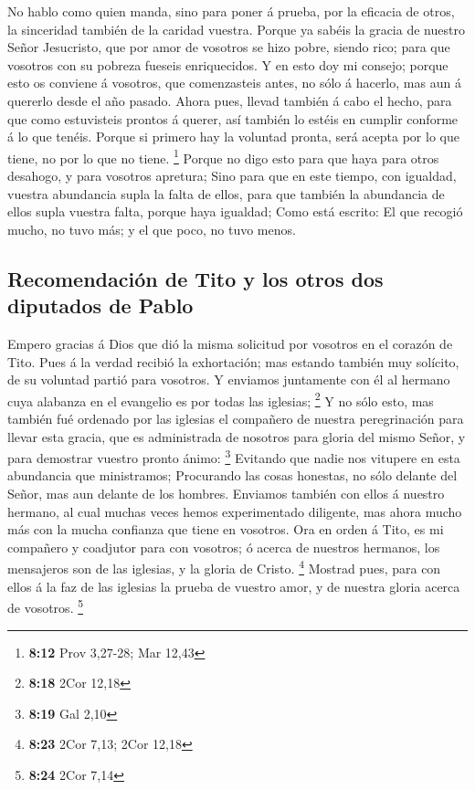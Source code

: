  No hablo como quien manda, sino para poner á prueba, por
la eficacia de otros, la sinceridad también de la caridad vuestra.
 Porque ya sabéis la gracia de nuestro Señor Jesucristo,
que por amor de vosotros se hizo pobre, siendo rico; para que vosotros
con su pobreza fueseis enriquecidos.  Y en esto doy mi
consejo; porque esto os conviene á vosotros, que comenzasteis antes, no
sólo á hacerlo, mas aun á quererlo desde el año pasado. 
Ahora pues, llevad también á cabo el hecho, para que como estuvisteis
prontos á querer, así también lo estéis en cumplir conforme á lo que
tenéis.  Porque si primero hay la voluntad pronta, será
acepta por lo que tiene, no por lo que no tiene. \footnote{\textbf{8:12}
  Prov 3,27-28; Mar 12,43}  Porque no digo esto para que
haya para otros desahogo, y para vosotros apretura;  Sino
para que en este tiempo, con igualdad, vuestra abundancia supla la falta
de ellos, para que también la abundancia de ellos supla vuestra falta,
porque haya igualdad;  Como está escrito: El que recogió
mucho, no tuvo más; y el que poco, no tuvo menos.

\hypertarget{recomendaciuxf3n-de-tito-y-los-otros-dos-diputados-de-pablo}{%
\subsection{Recomendación de Tito y los otros dos diputados de
Pablo}\label{recomendaciuxf3n-de-tito-y-los-otros-dos-diputados-de-pablo}}

 Empero gracias á Dios que dió la misma solicitud por
vosotros en el corazón de Tito.  Pues á la verdad recibió
la exhortación; mas estando también muy solícito, de su voluntad partió
para vosotros.  Y enviamos juntamente con él al hermano
cuya alabanza en el evangelio es por todas las iglesias; \footnote{\textbf{8:18}
  2Cor 12,18}  Y no sólo esto, mas también fué ordenado
por las iglesias el compañero de nuestra peregrinación para llevar esta
gracia, que es administrada de nosotros para gloria del mismo Señor, y
para demostrar vuestro pronto ánimo: \footnote{\textbf{8:19} Gal 2,10}
 Evitando que nadie nos vitupere en esta abundancia que
ministramos;  Procurando las cosas honestas, no sólo
delante del Señor, mas aun delante de los hombres. 
Enviamos también con ellos á nuestro hermano, al cual muchas veces hemos
experimentado diligente, mas ahora mucho más con la mucha confianza que
tiene en vosotros.  Ora en orden á Tito, es mi compañero
y coadjutor para con vosotros; ó acerca de nuestros hermanos, los
mensajeros son de las iglesias, y la gloria de Cristo. \footnote{\textbf{8:23}
  2Cor 7,13; 2Cor 12,18}  Mostrad pues, para con ellos á
la faz de las iglesias la prueba de vuestro amor, y de nuestra gloria
acerca de vosotros. \footnote{\textbf{8:24} 2Cor 7,14}

